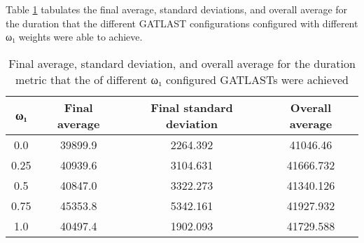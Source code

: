 Table \ref{tab:HP:GA:LTLWeight:duration} tabulates the final average, standard deviations, and overall average for the duration that the different GATLAST configurations configured with different ω₁ weights were able to achieve.
\begin{table}[tbh!]
\centering
\begin{adjustbox}{trim=0cm 0cm 0cm 0cm, clip=true}
\begin{tabular}{|c|c|c|c|}
\hline
ω₁ & Final average & Final standard deviation & Overall average\\
\hline
0.0 & 39899.9 & 2264.392 & 41046.46\\\hline
0.25 & 40939.6 & 3104.631 & 41666.732\\\hline
0.5 & 40847.0 & 3322.273 & 41340.126\\\hline
0.75 & 45353.8 & 5342.161 & 41927.932\\\hline
1.0 & 40497.4 & 1902.093 & 41729.588\\\hline
\end{tabular}
\end{adjustbox}
\caption{Final average, standard deviation, and overall average for the duration metric that the of different ω₁ configured GATLASTs were achieved}
\label{tab:HP:GA:LTLWeight:duration}
\end{table}
